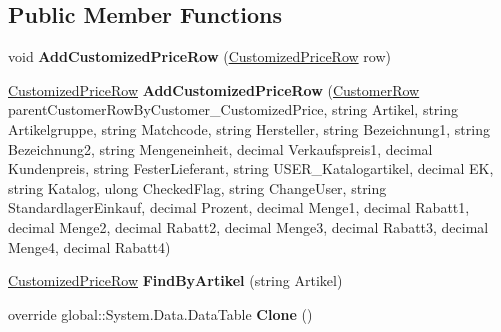 \subsection*{Public Member Functions}
\begin{DoxyCompactItemize}
\item 
void {\bfseries Add\+Customized\+Price\+Row} (\hyperlink{class_products_1_1_data_1_1ds_sage_1_1_customized_price_row}{Customized\+Price\+Row} row)\hypertarget{class_products_1_1_data_1_1ds_sage_1_1_customized_price_data_table_abdada1b19fbf07256cc422aa10110cc6}{}\label{class_products_1_1_data_1_1ds_sage_1_1_customized_price_data_table_abdada1b19fbf07256cc422aa10110cc6}

\item 
\hyperlink{class_products_1_1_data_1_1ds_sage_1_1_customized_price_row}{Customized\+Price\+Row} {\bfseries Add\+Customized\+Price\+Row} (\hyperlink{class_products_1_1_data_1_1ds_sage_1_1_customer_row}{Customer\+Row} parent\+Customer\+Row\+By\+Customer\+\_\+\+Customized\+Price, string Artikel, string Artikelgruppe, string Matchcode, string Hersteller, string Bezeichnung1, string Bezeichnung2, string Mengeneinheit, decimal Verkaufspreis1, decimal Kundenpreis, string Fester\+Lieferant, string U\+S\+E\+R\+\_\+\+Katalogartikel, decimal EK, string Katalog, ulong Checked\+Flag, string Change\+User, string Standardlager\+Einkauf, decimal Prozent, decimal Menge1, decimal Rabatt1, decimal Menge2, decimal Rabatt2, decimal Menge3, decimal Rabatt3, decimal Menge4, decimal Rabatt4)\hypertarget{class_products_1_1_data_1_1ds_sage_1_1_customized_price_data_table_adf0ffe331e64217c2558cb2c57fa2d5f}{}\label{class_products_1_1_data_1_1ds_sage_1_1_customized_price_data_table_adf0ffe331e64217c2558cb2c57fa2d5f}

\item 
\hyperlink{class_products_1_1_data_1_1ds_sage_1_1_customized_price_row}{Customized\+Price\+Row} {\bfseries Find\+By\+Artikel} (string Artikel)\hypertarget{class_products_1_1_data_1_1ds_sage_1_1_customized_price_data_table_acfb13055dded28fdfae6690ae468dead}{}\label{class_products_1_1_data_1_1ds_sage_1_1_customized_price_data_table_acfb13055dded28fdfae6690ae468dead}

\item 
override global\+::\+System.\+Data.\+Data\+Table {\bfseries Clone} ()\hypertarget{class_products_1_1_data_1_1ds_sage_1_1_customized_price_data_table_a251236a39ba03fd8f26e0e36f3d75c14}{}\label{class_products_1_1_data_1_1ds_sage_1_1_customized_price_data_table_a251236a39ba03fd8f26e0e36f3d75c14}


\end{DoxyCompactItemize}
